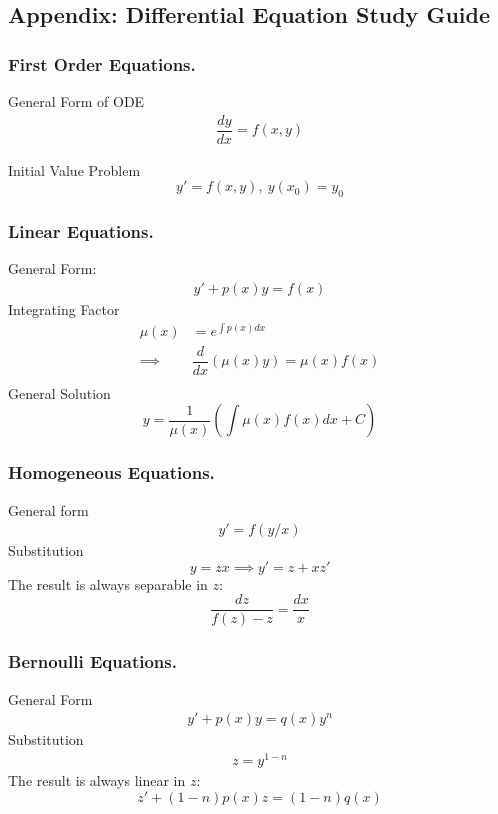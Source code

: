 \documentclass[../../main.tex]{subfiles}
\begin{document}
\subsection{Appendix: Differential Equation Study Guide}
\subsubsection{First Order Equations.} General Form of ODE
\begin{align*}
\dfrac{dy}{dx}=f(x,y)
\end{align*}

Initial Value Problem
\begin{equation*}
y'=f(x,y),\ y(x_0) = y_0
\end{equation*}

\subsubsection{Linear Equations.} General Form:
\begin{align*}
y'+p(x)y=f(x)
\end{align*}
Integrating Factor
\begin{align*}
 \mu(x) &= e^{\int p(x)dx}\\
  \implies & \dfrac{d}{dx}\left( \mu(x) y \right) = \mu(x) f(x)\\
\end{align*}
General Solution
\begin{equation*}
y=\frac{1}{\mu(x)}\left( \int \mu(x) f(x) dx + C\right)
\end{equation*}

\subsubsection{Homogeneous Equations.} General form
\begin{align*}
 y'=f(y/x)
\end{align*}
Substitution
\begin{equation*}
y=zx  \implies y'=z + xz'
\end{equation*}
The result is always separable in $z$: 
\begin{equation*}
\dfrac{dz}{f(z)-z} = \dfrac{dx}{x}
\end{equation*}

\subsubsection{Bernoulli Equations.} General Form
\begin{align*}
y'+p(x)y=q(x)y^n
\end{align*}
Substitution
\begin{align*}
z = y^{1-n}
\end{align*}
The result is always linear in $z$:
\begin{equation*}
 z' +(1-n)p(x) z = (1-n)q(x)
\end{equation*}
\end{document}
